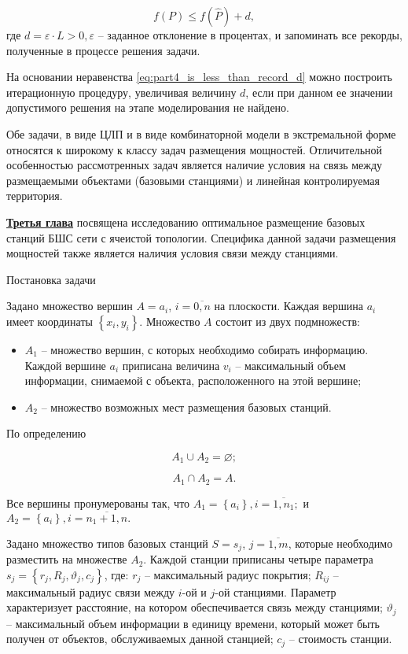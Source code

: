 \begin{equation}
    \label{eq:part4_is_less_than_record_d}
    f(P) \leqslant f(\widehat{P}) + d,
\end{equation}
где $d = \varepsilon \cdot L > 0, \varepsilon$ -- заданное отклонение в процентах, и запоминать все рекорды, полученные в процессе решения задачи.

На основании неравенства \cref{eq:part4_is_less_than_record_d} можно построить итерационную процедуру, увеличивая величину $d$, если при данном ее значении допустимого решения на этапе моделирования не найдено.

Обе задачи, в виде ЦЛП и в виде комбинаторной модели в экстремальной форме относятся к широкому к классу задач размещения мощностей. Отличительной особенностью рассмотренных задач является наличие условия на связь между размещаемыми объектами (базовыми станциями) и линейная контролируемая территория.

\underline{\textbf{Третья глава}} посвящена исследованию оптимальное размещение базовых станций БШС сети с ячеистой топологии. Специфика данной задачи размещения мощностей также является наличия условия связи между станциями.

Постановка задачи

Задано множество вершин $A = a_i$, $i=\overline{0,n}$ на плоскости. Каждая вершина $a_i$ имеет координаты $\left\{ x_i, y_i \right\}$.
Множество $A$ состоит из двух подмножеств: 
\begin{itemize}
    \item $A_1$ -- множество вершин, с которых необходимо собирать информацию. Каждой вершине $a_i$ приписана   величина $v_i$ -- максимальный объем информации, снимаемой с объекта, расположенного на этой вершине;
    \item $A_2$ -- множество возможных мест размещения базовых станций. 
\end{itemize}

По определению

$$
A_1 \cup A_2 = \varnothing;
$$

$$
A_1 \cap A_2 = A.
$$

Все вершины пронумерованы так, что $
A_1 = \left\{a_i \right\}, i= \overline{1,n_1};
$ и $
A_2 = \left\{ a_i  \right\}, i= \overline{n_1+1,n}.
$


Задано множество типов базовых станций $S = s_j$, $j=\overline{1,m}$, которые необходимо разместить на множестве $A_2$. Каждой станции приписаны четыре параметра $s_j = \left\{r_j, R_j, \vartheta_j, c_j \right\}$, где:
$r_j$ -- максимальный радиус покрытия; $R_{ij}$ -- максимальный радиус связи между $i$-ой и $j$-ой станциями. Параметр характеризует расстояние, на котором обеспечивается связь между станциями; $\vartheta_j$ -- максимальный объем информации в единицу времени, который может быть получен от объектов, обслуживаемых данной станцией; $c_j$ -- стоимость станции.


